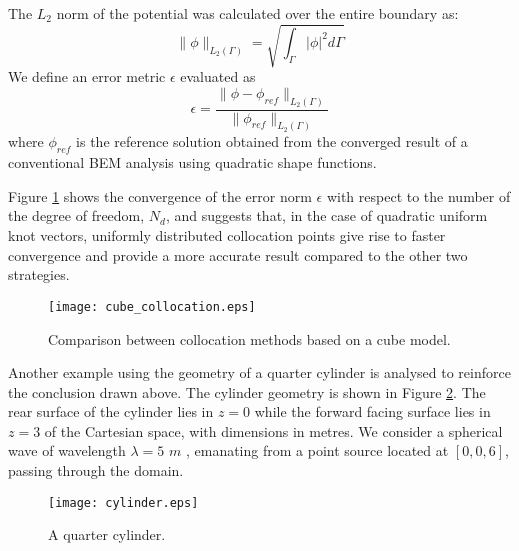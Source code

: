 \documentclass[review]{elsarticle}
\begin{document}
The $L_2$ norm of the potential was calculated over the entire boundary as:
\begin{equation}
\parallel\phi\parallel_{L_2(\Gamma)}=\sqrt{\int_{\Gamma}\left|\phi\right|^2d\Gamma}
\label{eq:errorL2}
\end{equation}
We define an error metric $\epsilon$ evaluated as
\begin{equation}
\epsilon=\frac{\parallel\phi-\phi_{ref}\parallel_{L_2(\Gamma)}}{\parallel\phi_{ref}\parallel_{L_2(\Gamma)}}
\end{equation}
where $\phi_{ref}$ is the reference solution obtained from the converged result of a conventional BEM analysis using quadratic shape functions. 


Figure \ref{collocation_result} shows the convergence of the error norm $\epsilon$ with respect to the number of the degree of freedom, $N_d$, and suggests that, in the case of quadratic uniform knot vectors, uniformly distributed collocation points give rise to faster convergence and provide a more accurate result compared to the other two strategies.
\begin{figure}[!htb]
	\centering
	\texttt{[image: cube\_collocation.eps]} 
	\caption{Comparison between collocation methods based on a cube model.}\label{collocation_result}                                                                                                                                                                                                                                
\end{figure}

Another example using the geometry of a quarter cylinder is analysed to reinforce the conclusion drawn above. The cylinder geometry is shown in Figure \ref{cylinder}. The rear surface of the cylinder lies in $z=0$ while the forward facing surface lies in $z=3$ of the Cartesian space, with dimensions in metres. We consider a spherical wave of wavelength $\lambda=5$ $m$ , emanating from a point source located at $[0,0,6]$, passing through the domain.
\begin{figure}[!htb]
	\centering
	\texttt{[image: cylinder.eps]} 
	\caption{A quarter cylinder.}\label{cylinder}         
\end{figure}
\end{document}

